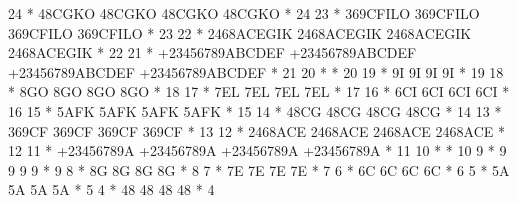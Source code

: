 \begin{Listing}
    24      *   48CGKO                   48CGKO                   48CGKO                   48CGKO                      *  24
    23      *   369CFILO                 369CFILO                 369CFILO                 369CFILO                    *  23
    22      *   2468ACEGIK               2468ACEGIK               2468ACEGIK               2468ACEGIK                  *  22
    21      *   +23456789ABCDEF          +23456789ABCDEF          +23456789ABCDEF          +23456789ABCDEF             *  21
    20      *                                                                                                          *  20
    19      *   9I                       9I                       9I                       9I                          *  19
    18      *   8GO                      8GO                      8GO                      8GO                         *  18
    17      *   7EL                      7EL                      7EL                      7EL                         *  17
    16      *   6CI                      6CI                      6CI                      6CI                         *  16
    15      *   5AFK                     5AFK                     5AFK                     5AFK                        *  15
    14      *   48CG                     48CG                     48CG                     48CG                        *  14
    13      *   369CF                    369CF                    369CF                    369CF                       *  13
    12      *   2468ACE                  2468ACE                  2468ACE                  2468ACE                     *  12
    11      *   +23456789A               +23456789A               +23456789A               +23456789A                  *  11
    10      *                                                                                                          *  10
     9      *   9                        9                        9                        9                           *   9
     8      *   8G                       8G                       8G                       8G                          *   8
     7      *   7E                       7E                       7E                       7E                          *   7
     6      *   6C                       6C                       6C                       6C                          *   6
     5      *   5A                       5A                       5A                       5A                          *   5
     4      *   48                       48                       48                       48                          *   4

\end{Listing}
